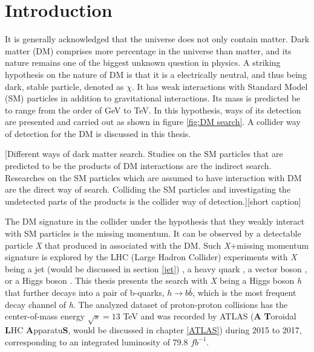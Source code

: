 \documentclass[class=NCU_thesis, crop=false]{standalone}
\begin{document}
	
	
\chapter{Introduction}
	It is generally acknowledged that the universe does not only contain matter. Dark matter (DM) \cite{hep-ph/0404175} comprises more percentage in the universe than matter, and its nature remains one of the biggest unknown question in physics. A striking hypothesis on the nature of DM \cite{STEIGMAN1985375, PhysRevD.33.1585} is that it is a electrically neutral, and thus being dark, stable particle, denoted as $\chi$. It has weak interactions with Standard Model (SM) particles in addition to gravitational interactions. Its mass is predicted be to range from the order of GeV to TeV. In this hypothesis, ways of its detection are presented and carried out as shown in figure \ref{fig:DM search}. A collider way of detection for the DM \cite{1507.00966} is discussed in this thesis.
	
	[Different ways of dark matter search. Studies on the SM particles that are predicted to be the products of DM interactions are the indirect search. Researches on the SM particles which are assumed to have interaction with DM are the direct way of search. Colliding the SM particles and investigating the undetected parts of the products is the collider way of detection.][short caption]
	
	\newpage
	
	The DM signature in the collider under the hypothesis that they weakly interact with SM particles is the missing momentum. It can be observed by a detectable particle \textit{X} that produced in associated with the DM. Such \textit{X}+missing momentum signature is explored by the LHC (Large Hadron Collider) experiments with \textit{X} being a jet (would be discussed in section \ref{jet}) \cite{1711.03301, 1712.02345}, a heavy quark \cite{1710.11412, 1711.11520, 1801.08427, 1706.02581}, a vector boson \cite{1712.02345, 1704.03848, 1708.09624, 1711.00431, 1706.03794, 1701.02042}, or a Higgs boson \cite{1706.03948, 1707.01302, 1806.04771, 1703.05236}. This thesis presents the search with \textit{X} being a Higgs boson \textit{h} that further decays into a pair of b-quarks, $h \rightarrow b\bar{b}$, which is the most frequent decay channel of \textit{h}. The analyzed dataset of proton-proton collisions has the center-of-mass energy $\sqrt{s} = 13$ TeV and was recorded by ATLAS (\textbf{A} \textbf{T}oroidal \textbf{L}HC \textbf{A}pparatu\textbf{S}, would be discussed in chapter \ref{ATLAS}) during 2015 to 2017, corresponding to an integrated luminosity of 79.8 $fb^{-1}$.
	
\end{document}
